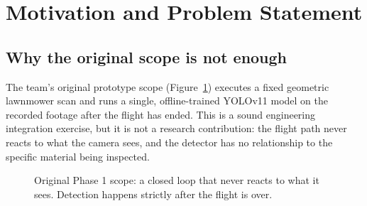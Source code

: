 \documentclass[11pt,a4paper]{article}
\begin{document}
\newpage
\tableofcontents
\newpage

\section{Motivation and Problem Statement}

\subsection{Why the original scope is not enough}

The team's original prototype scope (Figure~\ref{fig:original-pipeline}) executes a fixed geometric lawnmower scan and runs a single, offline-trained YOLOv11 model on the recorded footage after the flight has ended. This is a sound engineering integration exercise, but it is not a research contribution: the flight path never reacts to what the camera sees, and the detector has no relationship to the specific material being inspected.

\begin{figure}[h!]
\centering
{}
\caption{Original Phase 1 scope: a closed loop that never reacts to what it sees. Detection happens strictly after the flight is over.}
\label{fig:original-pipeline}
\end{figure}
\end{document}
